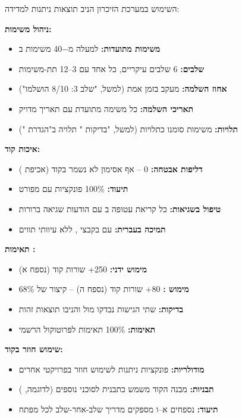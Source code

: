 
השימוש במערכת הזיכרון הניב תוצאות ניתנות למדידה:

\textbf{ניהול משימות:}
\begin{itemize}
  \item \textbf{משימות מתועדות:} למעלה מ\num{-40} משימות ב
  \item \textbf{שלבים:} \num{6} שלבים עיקריים, כל אחד עם \num{3}–\num{12} תת-משימות
  \item \textbf{אחוז השלמה:} מעקב בזמן אמת (למשל, "שלב \num{3}: \num{8}/\num{10} הושלמו")
  \item \textbf{תאריכי השלמה:} כל משימה מתועדת עם תאריך מדויק
  \item \textbf{תלויות:} משימות סומנו כתלויות (למשל, "בדיקות " תלויה ב"הגדרת ")
\end{itemize}

\textbf{איכות קוד:}
\begin{itemize}
  \item \textbf{דליפות אבטחה:} \num{0} – אף אסימון  לא נשמר בקוד (אכיפת )
  \item \textbf{תיעוד:} \num{100}\% פונקציות עם  מפורט
  \item \textbf{טיפול בשגיאות:} כל קריאת  עטופה ב עם הודעות שגיאה ברורות
  \item \textbf{תמיכה בעברית:}  עם  בקבצי , ללא עיוותי תווים
\end{itemize}

\textbf{תאימות :}
\begin{itemize}
  \item \textbf{מימוש ידני:} \num{250}+ שורות קוד (נספח א)
  \item \textbf{מימוש :} \num{80}+ שורות קוד (נספח ה) – קיצור של \num{68}\%
  \item \textbf{בדיקות:} שתי הגישות נבדקו מול  והניבו תוצאות זהות
  \item \textbf{תאימות:} \num{100}\% תאימות לפרוטוקול  הרשמי
\end{itemize}

\textbf{שימוש חוזר בקוד:}
\begin{itemize}
  \item \textbf{מודולריות:} פונקציות  ניתנות לשימוש חוזר בפרויקטי  אחרים
  \item \textbf{תבניות:} מבנה הקוד משמש כתבנית לסוכני  נוספים (לדוגמה, )
  \item \textbf{תיעוד:} נספחים א–ו מספקים מדריך שלב-אחר-שלב לכל מפתח
\end{itemize}

